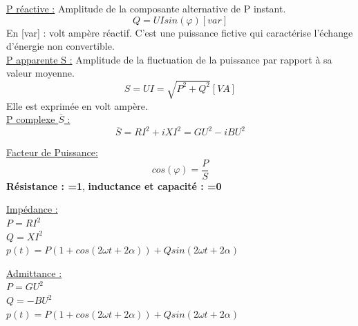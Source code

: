 \documentclass[../main.tex]{subfiles}
\begin{document}
\quad \underline{P réactive :} Amplitude de la composante alternative de P instant.
\begin{equation}
    Q = UIsin(\varphi) [var]
\end{equation}
En [var] : volt ampère réactif. C'est une puissance fictive qui caractérise l'échange d'énergie non convertible.\\

\quad \underline{P apparente S :} Amplitude de la fluctuation de la puissance par rapport à sa valeur moyenne.
\begin{equation}
    S = UI = \sqrt{P^2+Q^2} [VA]
\end{equation}
Elle est exprimée en volt ampère.\\

\quad \underline{P complexe $\overline{S}$ :}\\
\begin{equation}
    \overline{S} = RI^2+iXI^2 = GU^2-iBU^2
\end{equation}

\quad \underline{Facteur de Puissance:}\\
\begin{equation}
    cos(\varphi) = \frac{P}{S}
\end{equation}
\textbf{Résistance : =1}, \textbf{inductance et capacité : =0}\\

\begin{minipage}{.5\textwidth}
    \quad \underline{Impédance :}\\
$P = RI^2$\\
$Q = XI^2$\\
$p(t) = P(1+cos(2\omega t+2\alpha)) + Qsin(2\omega t+2\alpha)$\\

\end{minipage}
\vline
\vline
\begin{minipage}{.5\textwidth}
    \quad \underline{Admittance :}\\
$P = GU^2$\\
$Q = -BU^2$\\
$p(t) = P(1+cos(2\omega t+2\alpha)) + Qsin(2\omega t+2\alpha)$\\

\end{minipage}
\end{document}
